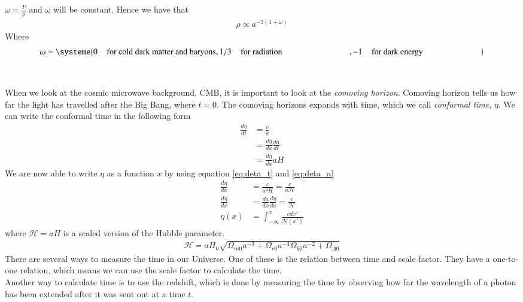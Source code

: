 \documentclass{aa}
\begin{document}
    $\omega=\frac{P}{\rho}$ and $\omega$ will be constant.
Hence we have that 
\begin{align}
    \rho\propto a^{-3(1+\omega)}
\end{align}
Where
\begin{equation}
\omega=
\systeme{
  0\;\;\;\; \text{for cold dark matter and baryons},
  1/3\;\;\;\; \text{for radiation} \;\;\;\;\;\;\;\;\;\;\;\;\;\;\;\;\;\;\;\;\;\;\;\;\;\;\;\;\;,
  -1\;\;\;\; \text{for dark energy}\;\;\;\;\;\;\;\;\;\;\;\;\;\;\;\;\;\;\;\;\;\;\;\;\;
} \label{eq:omega_val}
\end{equation}
\\
\\
When we look at the cosmic microwave background, CMB, it is important to look at the \emph{comoving horizon}. Comoving horizon tells us how far the light has travelled after the Big Bang, where $t=0$. The comoving horizons expands with time, which we call \emph{conformal time}, $\eta$. We can write the conformal time in the following form
\begin{align}
    \frac{d\eta}{dt}&=\frac{c}{a}\label{eq:deta_t}\\
    &=\frac{d\eta}{da}\frac{da}{dt}\\
    &=\frac{d\eta}{da}aH \label{eq:deta_a}
\end{align}
We are now able to write $\eta$ as a function $x$ by using equation \eqref{eq:deta_t} and \eqref{eq:deta_a}
\begin{align}
    \frac{d\eta}{da}&=\frac{c}{a^2H}=\frac{c}{a\mathcal{H}}\\
    \frac{d\eta}{dx}&=\frac{da}{dx}\frac{d\eta}{da}=\frac{c}{\mathcal{H}}\\
    \eta(x)&=\int_{-\infty}^x\frac{cdx'}{\mathcal{H}(x')} \label{eq:eta_x}
\end{align}
where $\mathcal{H}=aH$ is a scaled version of the Hubble parameter.
\begin{align}
    \mathcal{H}=aH_0\sqrt{\Omega_{m0}a^{-3}+\Omega_{r0}a^{-4}\Omega_{k0}a^{-2}+\Omega_{\Lambda0}} \label{eq:Friedmann_eq_Hp}
\end{align}
There are several ways to measure the time in our Universe. One of these is the relation between time and scale factor. They have a one-to-one relation, which means we can use the scale factor to calculate the time.\\
 Another way to calculate time is to use the redshift, which is done by measuring the time by observing how far the wavelength of a photon has been extended after it was sent out at a time $t$.
\end{document}
